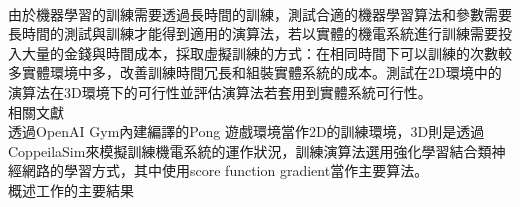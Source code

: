 \begin{flushleft}
\fontsize{12pt}{12pt} \\
\end{flushleft}

由於機器學習的訓練需要透過長時間的訓練，測試合適的機器學習算法和參數需要長時間的測試與訓練才能得到適用的演算法，若以實體的機電系統進行訓練需要投入大量的金錢與時間成本，採取虛擬訓練的方式：在相同時間下可以訓練的次數較多實體環境中多，改善訓練時間冗長和組裝實體系統的成本。測試在2D環境中的演算法在3D環境下的可行性並評估演算法若套用到實體系統可行性。\\

相關文獻\\

透過OpenAI Gym內建編譯的Pong 遊戲環境當作2D的訓練環境，3D則是透過CoppeilaSim來模擬訓練機電系統的運作狀況，訓練演算法選用強化學習結合類神經網路的學習方式，其中使用score function gradient當作主要算法。\\

概述工作的主要結果\\


